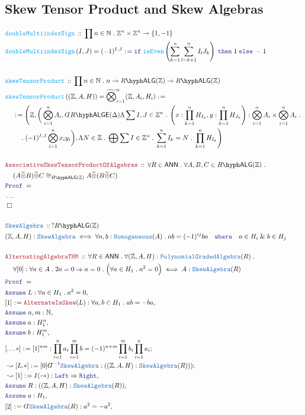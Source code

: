 \documentclass[12pt]{scrartcl}%
\newcommand{\TYPE}[1]{\textcolor{NavyBlue}{\mathtt{#1}}}%
\newcommand{\FUNC}[1]{\textcolor{Cerulean}{\mathtt{#1}}}%
\newcommand{\LOGIC}[1]{\textcolor{Blue}{\mathtt{#1}}}%
\newcommand{\THM}[1]{\textcolor{Maroon}{\mathtt{#1}}}%
\renewcommand{\.}{\; . \;} %
\newcommand{\de}{: \kern 0.1pc =} %
\newcommand{\where}{\LOGIC{where}} %
\newcommand{\If}{\LOGIC{if} \;} %
\newcommand{\Then}{ \; \LOGIC{then} \;} %
\newcommand{\Else}{\; \LOGIC{else} \;} %
\newcommand{\Act}[1]{\left( #1 \right)} %
\newcommand{\Theorem}[2]{& \THM{#1} \, :: \, #2 \\ & \Proof = \\ } %
\newcommand{\DeclareType}[2]{& \TYPE{#1} \, :: \, #2 \\}%
\newcommand{\DefineType}[3]{& #1 : \TYPE{#2} \iff #3 \\}%
\newcommand{\DeclareFunc}[2]{& \FUNC{#1} \, :: \, #2 \\}%
\newcommand{\DefineNamedFunc}[4]{&  \FUNC{#1}\Act{#2} = #3 \de #4 \\}%
\newcommand{\NewLine}{\\ & \kern 1pc}%
\newcommand{\Page}[1]{ \begin{align*} #1 \end{align*}  }%
\newcommand{ \bd }{ \ByDef }%
\newcommand{\NoProof}{ & \ldots \\ \EndProof}%
\renewcommand{\And}{\; \& \;}%
\newcommand{\Int}{\mathbb{Z}}%
\newcommand{\Nat}{\mathbb{N}}%
\newcommand{\Say}[3]{& #1 \de #2 : #3, \\} %
\newcommand{\Conclude}[3]{& #1 \de #2 : #3; \\}%
\newcommand{\Derive}[3]{& \leadsto #1 \de #2 : #3, \\} %
\newcommand{\DeriveConclude}[3]{& \leadsto #1 \de #2 : #3 ; \\} %
\newcommand{\Assume}[2]{& \LOGIC{Assume} \; #1 : #2, \\} %
\newcommand{\QED}{\; \square} %
\newcommand{\EndProof}{& \QED \\} %
\newcommand{\ByDef}{\rotatebox[origin=c]{-180}{$D$}}%
\newcommand{\Proof}{\LOGIC{Proof} \; } %
\newcommand{\ANN}{\mathsf{ANN}} %
\newcommand{\LALG}[1]{#1\hyph\mathsf{ALG}}%
\newcommand{\LALGE}[1]{#1\hyph\mathsf{ALGE}}%
\newcommand{\PGA}{\TYPE{PolynomialGradedAlgebra}}
\begin{document}
\subsection{Skew Tensor Product and Skew Algebras}
\Page{
	\DeclareFunc{doubleMultiindexSign}{ \prod  n \in \Nat \. \Int^n \times \Int^n \to \{1,-1\}  }
	\DefineNamedFunc{doubleMultiindexSign}{I,J}{(-1)^{I,J}}{\If \FUNC{isEven}\left(\sum^{n}_{k=1}\sum^n_{l=k+1} I_l J_k  \right) \Then 1 \Else -1}
	\\
	\DeclareFunc{skewTensorProduct}{ \prod n \in \Nat \. n \to \LALG{R}(\Int)  \to \LALG{R}(\Int)  }	
	\DefineNamedFunc{skewTensorProduct}{(\Int,A,H)}{ \widetilde{\bigotimes}^n_{i=1} (\Int,A_i,H_i)}
	{
		\NewLine \de
		\Bigg( 
			\Int , 
			\bigg(  
				\bigotimes^n_{i=1} A_i,
				\bd \LALGE{R}(\Delta) 
				\Lambda 
				\sum 
					I,J \in \Int^n \. 
					\left( 
						x : \prod^n_{k=1} H_{I_k} , 
						y : \prod^n_{k=1} H_{J_k}
					\right) :  \bigotimes^n_{i=1} A_i \times \bigotimes^n_{i=1} A_i 
					\. \NewLine  \quad \.  
				(-1)^{I,J}\bigotimes^n_{i=1} x_i y_i		
			\bigg), 
			\Lambda 
			N \in \Int \. 
			\bigoplus 
				\sum I \in \Int^n \. 
				\sum^n_{k=1} I_k = N \. 
			\prod^n_{k=1} H_{I_k} 
		\Bigg)
	}
	\\
	\Theorem{AssociativeSkewTensorProductOfAlgebras}{\forall R \in \ANN \. \forall A,B,C \in \LALG{R}(\Int) \. \NewLine (A \widetilde{\otimes} B) \widetilde{\otimes} C \cong_{\LALG{R}(\Int)} 
		A \widetilde{\otimes} (B \widetilde{\otimes} C)}
	\NoProof
	\\
	\DeclareType{SkewAlgebra}{?\LALG{R}(\Int)}
	\DefineType{(\Int ,A, H)}{SkewAlgebra}{ \forall a,b : \TYPE{Homogeneous}(A) \. ab = (-1)^{ij}ba \quad \where \quad a \in H_i \And b \in H_j  }
	\\
	\Theorem{AlternatingAlgebraTHM}{
		\forall R \in \ANN \.  
		\forall (\Int, A, H) : \PGA(R) \. 
		\NewLine 
		\forall [0] : \forall a \in A \. 2a = 0 \Rightarrow a = 0 \. 
			\Big(\forall a \in H_1 \. a^2 = 0\Big) 
			\iff
			A : \TYPE{SkewAlgebra}(R)
		}
	\Assume{L}{\forall a \in H_1 \. a^2 = 0}
	\Say{[1]}{\THM{AlternateIsSkew}(L)}{ \forall a,b \in H_1 \. ab = - ba   }
	\Assume{n,m}{\Nat}
	\Assume{a}{H_1^n}
	\Assume{b}{H_1^m}
	\Conclude{[\ldots*]}{[1]^{nm}}{ \prod^n_{i=1}a_i \prod^m_{i=1}b = (-1)^{n+m} \prod^m_{i=1}b_i \prod^n_{i=1} a_i}
	\DeriveConclude{[L.*]}{[0]\bd^{-1}\TYPE{SkewAlgebra}}{((\Int,A,H) : \TYPE{SkewAlgebra}(R)))}
	\Derive{[1]}{ I(\rightarrow)  }{\LOGIC{Left} \Rightarrow \LOGIC{Right}}
	\Assume{R}{((\Int,A,H) : \TYPE{SkewAlgebra}(R))}
	\Assume{a}{H_1}
	\Say{[2]}{\bd \TYPE{SkewAlgebra}(R)}{ a^2 = - a^2 }
}
\end{document}
